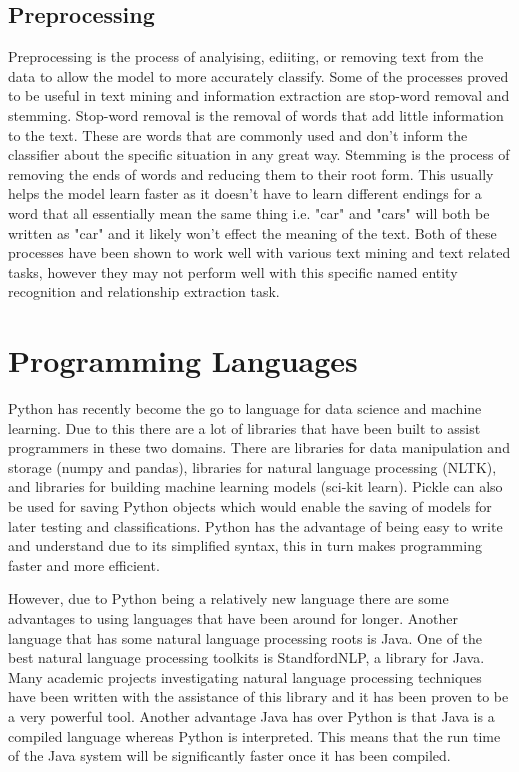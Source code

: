 \documentclass[11pt,oneside]{book}
\begin{document}
\subsection{Preprocessing}
Preprocessing is the process of analyising, ediiting, or removing text from the data to allow the model to more accurately classify. Some of the processes proved to be useful in text mining and information extraction \citep{preprocessing} are stop-word removal and stemming. Stop-word removal is the removal of words that add little information to the text. These are words that are commonly used and don't inform the classifier about the specific situation in any great way. Stemming is the process of removing the ends of words and reducing them to their root form. This usually helps the model learn faster as it doesn't have to learn different endings for a word that all essentially mean the same thing i.e. "car" and "cars" will both be written as "car" and it likely won't effect the meaning of the text. Both of these processes have been shown to work well with various text mining and text related tasks, however they may not perform well with this specific named entity recognition and relationship extraction task. 

\section{Programming Languages}
Python has recently become the go to language for data science and machine learning. Due to this there are a lot of libraries that have been built to assist programmers in these two domains. There are libraries for data manipulation and storage (numpy and pandas), libraries for natural language processing (NLTK), and libraries for building machine learning models (sci-kit learn). Pickle can also be used for saving Python objects which would enable the saving of models for later testing and classifications. Python has the advantage of being easy to write and understand due to its simplified syntax, this in turn makes programming faster and more efficient.

However, due to Python being a relatively new language there are some advantages to using languages that have been around for longer. Another language that has some natural language processing roots is Java. One of the best natural language processing toolkits is StandfordNLP, a library for Java. Many academic projects investigating natural language processing techniques have been written with the assistance of this library and it has been proven to be a very powerful tool. Another advantage Java has over Python is that Java is a compiled language whereas Python is interpreted. This means that the run time of the Java system will be significantly faster once it has been compiled.
\end{document}
